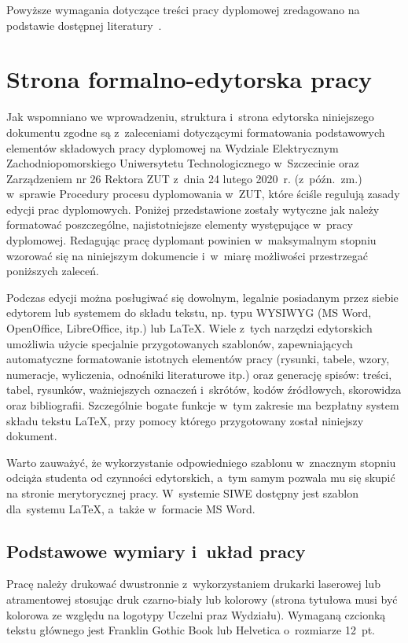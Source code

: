 \documentclass[skorowidz,skroty]{dyplomWEZUT}
\begin{document}
\noindent Powyższe wymagania dotyczące treści pracy dyplomowej zredagowano na podstawie dostępnej literatury~\cite{Boc2003,Honczarenko2000,Opoka2001,Pioterek1997,Zenderowski2004}.

\chapter{Strona formalno-edytorska pracy}\label{chap:editing}

Jak wspomniano we wprowadzeniu, struktura i~strona edytorska niniejszego dokumentu zgodne są z~zaleceniami dotyczącymi formatowania podstawowych elementów składowych pracy dyplomowej na Wydziale Elektrycznym Zachodniopomorskiego Uniwersytetu Technologicznego w~Szczecinie oraz Zarządzeniem nr 26 Rektora ZUT z~dnia 24 lutego 2020~r. (z~późn.~zm.) w~sprawie Procedury procesu dyplomowania w~ZUT, które ściśle regulują zasady edycji prac dyplomowych. Poniżej przedstawione zostały wytyczne jak należy formatować poszczególne, najistotniejsze elementy występujące w~pracy dyplomowej. Redagując pracę dyplomant powinien w~maksymalnym stopniu wzorować się na niniejszym dokumencie i~w~miarę możliwości przestrzegać poniższych zaleceń.

Podczas edycji można posługiwać się dowolnym, legalnie posiadanym przez siebie edytorem lub systemem do składu tekstu, np. typu WYSIWYG (MS Word, OpenOffice, LibreOffice, itp.) lub LaTeX. Wiele z~tych narzędzi edytorskich umożliwia użycie specjalnie przygotowanych szablonów, zapewniających automatyczne formatowanie istotnych elementów pracy (rysunki, tabele, wzory, numeracje, wyliczenia, odnośniki literaturowe itp.) oraz generację spisów: treści, tabel, rysunków, ważniejszych oznaczeń i~skrótów, kodów źródłowych, skorowidza oraz bibliografii. Szczególnie bogate funkcje w~tym zakresie ma bezpłatny system składu tekstu LaTeX, przy pomocy którego przygotowany został niniejszy dokument.

Warto zauważyć, że wykorzystanie odpowiedniego szablonu w~znacznym stopniu odciąża studenta od czynności edytorskich, a~tym samym pozwala mu się skupić na stronie merytorycznej pracy. W~systemie SIWE dostępny jest szablon dla~systemu LaTeX, a~także w~formacie MS Word.

\section{Podstawowe wymiary i~układ pracy}\label{sec:wymiary}

Pracę należy drukować dwustronnie z~wykorzystaniem drukarki laserowej lub atramentowej stosując druk czarno-biały lub kolorowy (strona tytułowa musi być kolorowa ze względu na logotypy Uczelni praz Wydziału). Wymaganą czcionką tekstu głównego jest Franklin Gothic Book lub Helvetica o~rozmiarze 12~pt. 
\end{document}
